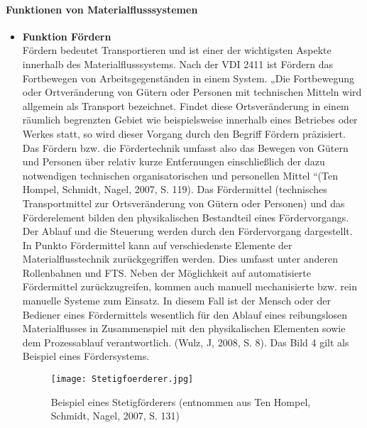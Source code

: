 \paragraph{Funktionen von Materialflusssystemen}
\begin{itemize}
	\item \textbf{Funktion F\"ordern} \\
F\"ordern bedeutet Transportieren und ist einer der wichtigsten Aspekte innerhalb des Materialflusssystems.
Nach der VDI 2411 ist F\"ordern das Fortbewegen von Arbeitsgegenst\"anden in einem System.
„Die Fortbewegung oder Ortver\"anderung von G\"utern oder Personen mit technischen Mitteln wird allgemein als Transport bezeichnet.
Findet diese Ortsver\"anderung in einem r\"aumlich begrenzten Gebiet wie beispielsweise innerhalb eines Betriebes oder Werkes statt, so wird dieser Vorgang durch den Begriff F\"ordern pr\"azisiert.
Das F\"ordern bzw. die F\"ordertechnik umfasst also das Bewegen von G\"utern und Personen \"uber relativ kurze Entfernungen einschlie\ss lich der dazu notwendigen technischen organisatorischen und personellen Mittel “(Ten Hompel, Schmidt, Nagel, 2007, S. 119). 
Das F\"ordermittel (technisches Transportmittel zur Ortsver\"anderung von G\"utern oder Personen) und das F\"orderelement bilden den physikalischen Bestandteil eines F\"ordervorgangs.
Der Ablauf und die Steuerung werden durch den F\"ordervorgang dargestellt.
In Punkto F\"ordermittel kann auf verschiedenste Elemente der Materialflusstechnik zur\"uckgegriffen werden.
Dies umfasst unter anderen Rollenbahnen und FTS.
Neben der M\"oglichkeit auf automatisierte F\"ordermittel zur\"uckzugreifen, kommen auch manuell mechanisierte bzw. rein manuelle Systeme zum Einsatz.
In diesem Fall ist der Mensch oder der Bediener eines F\"ordermittels wesentlich f\"ur den Ablauf eines reibungslosen Materialflusses in Zusammenspiel mit den physikalischen Elementen sowie dem Prozessablauf verantwortlich. (Wulz, J, 2008, S. 8).
Das Bild 4 gilt als Beispiel eines F\"ordersystems. 
	\begin{figure}[h!]
	\centering
  \texttt{[image: Stetigfoerderer.jpg]}
	\caption{Beispiel eines Stetigf\"orderers (entnommen aus Ten Hompel, Schmidt, Nagel, 2007, S. 131)}
	\label{Stetigfoerderer}
\end{figure}


\end{itemize}
